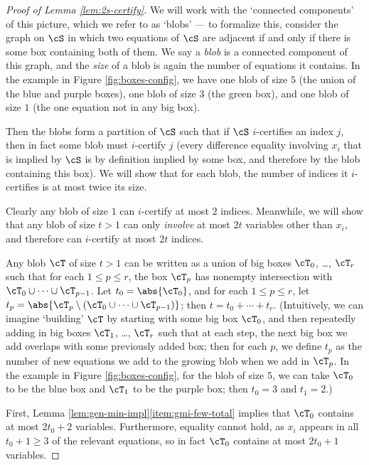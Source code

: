 \begin{proof}[Proof of Lemma \ref{lem:2s-certify}]
    We will work with the `connected components' of this picture, which we refer to as `blobs' --- to formalize this, consider the graph on $\cS$ in which two equations of $\cS$ are adjacent if and only if there is some box containing both of them. We say a \emph{blob} is a connected component of this graph, and the \emph{size} of a blob is again the number of equations it contains. In the example in Figure \ref{fig:boxes-config}, we have one blob of size $5$ (the union of the blue and purple boxes), one blob of size $3$ (the green box), and one blob of size $1$ (the one equation not in any big box). 

    Then the blobs form a partition of $\cS$ such that if $\cS$ $i$-certifies an index $j$, then in fact some blob must $i$-certify $j$ (every difference equality involving $x_i$ that is implied by $\cS$ is by definition implied by some box, and therefore by the blob containing this box). We will show that for each blob, the number of indices it $i$-certifies is at most twice its size.

    Clearly any blob of size $1$ can $i$-certify at most $2$ indices. Meanwhile, we will show that any blob of size $t > 1$ can only \emph{involve} at most $2t$ variables other than $x_i$, and therefore can $i$-certify at most $2t$ indices. 

    Any blob $\cT$ of size $t > 1$ can be written as a union of big boxes $\cT_0$, \ldots, $\cT_r$ such that for each $1 \leq p \leq r$, the box $\cT_p$ has nonempty intersection with $\cT_0 \cup \cdots \cup \cT_{p - 1}$. Let $t_0 = \abs{\cT_0}$, and for each $1 \leq p \leq r$, let $t_p = \abs{\cT_p \setminus (\cT_0 \cup \cdots \cup \cT_{p - 1})}$; then $t = t_0 + \cdots + t_r$. (Intuitively, we can imagine `building' $\cT$ by starting with some big box $\cT_0$, and then repeatedly adding in big boxes $\cT_1$, \ldots, $\cT_r$ such that at each step, the next big box we add overlaps with some previously added box; then for each $p$, we define $t_p$ as the number of new equations we add to the growing blob when we add in $\cT_p$. In the example in Figure \ref{fig:boxes-config}, for the blob of size $5$, we can take $\cT_0$ to be the blue box and $\cT_1$ to be the purple box; then $t_0 = 3$ and $t_1 = 2$.)

    First, Lemma \ref{lem:gen-min-impl}\ref{item:gmi-few-total} implies that $\cT_0$ contains at most $2t_0 + 2$ variables. Furthermore, equality cannot hold, as $x_i$ appears in all $t_0 + 1 \geq 3$ of the relevant equations, so in fact $\cT_0$ contains at most $2t_0 + 1$ variables. 


\end{proof}
